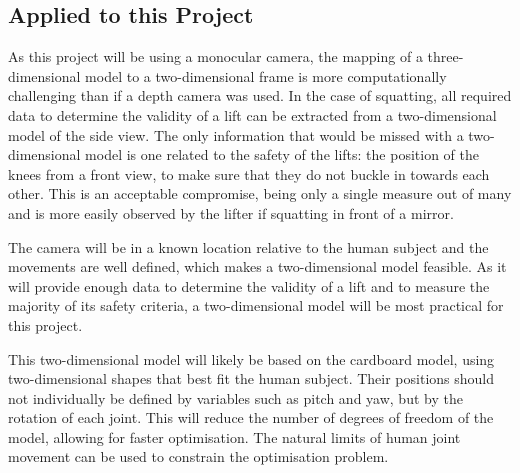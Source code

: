 \subsection{Applied to this Project}

As this project will be using a monocular camera, the mapping of a three-dimensional model to a two-dimensional frame is more computationally challenging than if a depth camera was used. In the case of squatting, all required data to determine the validity of a lift can be extracted from a two-dimensional model of the side view. The only information that would be missed with a two-dimensional model is one related to the safety of the lifts: the position of the knees from a front view, to make sure that they do not buckle in towards each other. This is an acceptable compromise, being only a single measure out of many and is more easily observed by the lifter if squatting in front of a mirror.

The camera will be in a known location relative to the human subject and the movements are well defined, which makes a two-dimensional model feasible. As it will provide enough data to determine the validity of a lift and to measure the majority of its safety criteria, a two-dimensional model will be most practical for this project.

This two-dimensional model will likely be based on the cardboard model, using two-dimensional shapes that best fit the human subject. Their positions should not individually be defined by variables such as pitch and yaw, but by the rotation of each joint. This will reduce the number of degrees of freedom of the model, allowing for faster optimisation. The natural limits of human joint movement can be used to constrain the optimisation problem.